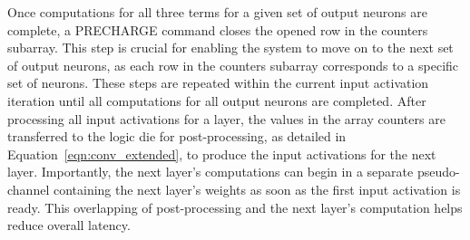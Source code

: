 Once computations for all three terms for a given set of output neurons are complete, a PRECHARGE command closes the opened row in the counters subarray. This step is crucial for enabling the system to move on to the next set of output neurons, as each row in the counters subarray corresponds to a specific set of neurons. These steps are repeated within the current input activation iteration until all computations for all output neurons are completed. After processing all input activations for a layer, the values in the array counters are transferred to the logic die for post-processing, as detailed in Equation~\ref{eqn:conv_extended}, to produce the input activations for the next layer. Importantly, the next layer's computations can begin in a separate pseudo-channel containing the next layer's weights as soon as the first input activation is ready. This overlapping of post-processing and the next layer's computation helps reduce overall latency.

\begin{table}[t!]
\caption{Baseline accuracy vs accuracy after performing exponential quantization for the evaluated LLM models. The average bitwidth is the mean each layer's exponents.}
\label{t:LLMs}
\vskip -0.20in
\begin{center}
\end{center}
\vskip -0.20in
\end{table}

